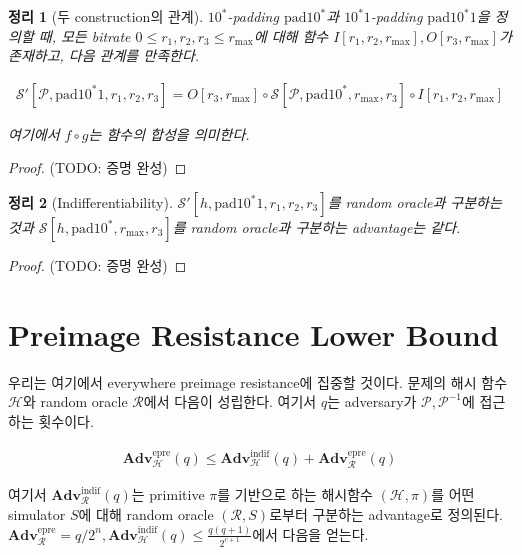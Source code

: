 \documentclass{article}
\newtheorem{theorem}{정리}
\newcommand{\adv}{\mathbf{Adv}}
\begin{document}
  \begin{theorem}[두 construction의 관계]
    \(10^*\)-padding \(\mathrm{pad10^*}\)과 \(10^*1\)-padding \(\mathrm{pad10^*1}\)을 정의할 때, 모든 bitrate \(0 \leq r_1, r_2, r_3 \leq r_\mathrm{max}\)에 대해 함수 \(I[r_1, r_2, r_\mathrm{max}], O[r_3, r_\mathrm{max}]\)가 존재하고, 다음 관계를 만족한다.

    \begin{align*}
      \mathcal{S}'[\mathcal{P}, \mathrm{pad10^*1}, r_1, r_2, r_3] = O[r_3, r_\mathrm{max}] \circ \mathcal{S}[\mathcal{P}, \mathrm{pad10^*}, r_\mathrm{max}, r_3] \circ I[r_1, r_2, r_\mathrm{max}]
    \end{align*}

    여기에서 \(f \circ g\)는 함수의 합성을 의미한다.
  \end{theorem}
  \begin{proof}
    (TODO: 증명 완성)
  \end{proof}

  \begin{theorem}[Indifferentiability]
    \(\mathcal{S}'[h, \mathrm{pad10^*1}, r_1, r_2, r_3]\)를 random oracle과 구분하는 것과 \(\mathcal{S}[h, \mathrm{pad10^*}, r_\mathrm{max}, r_3]\)를 random oracle과 구분하는 advantage는 같다.
  \end{theorem}
  \begin{proof}
    (TODO: 증명 완성)
  \end{proof}

  \section{Preimage Resistance Lower Bound}
  우리는 여기에서 everywhere preimage resistance에 집중할 것이다.\cite{rogaway_cryptographic_2004} 문제의 해시 함수 \(\mathcal{H}\)와 random oracle \(\mathcal{R}\)에서 다음이 성립한다.\cite{andreeva_security_2011} 여기서 \(q\)는 adversary가 \(\mathcal{P}, \mathcal{P}^{-1}\)에 접근하는 횟수이다.

  \begin{align}\label{epre_adv_bound}
    \adv^\text{epre}_\mathcal{H}(q) \leq \adv^\text{indif}_\mathcal{H}(q) + \adv^\text{epre}_\mathcal{R}(q)
  \end{align}

  여기서 \(\adv^\text{indif}_\mathcal{R}(q)\)는 primitive \(\pi\)를 기반으로 하는 해시함수 \((\mathcal{H}, \pi)\)를 어떤 simulator \(S\)에 대해 random oracle \((\mathcal{R}, S)\)로부터 구분하는 advantage로 정의된다. \(\adv^\text{epre}_\mathcal{R}=q/2^n, \adv^\text{indif}_\mathcal{H}(q)\leq \frac{q(q + 1)}{2^{c + 1}}\)에서 다음을 얻는다.
\end{document}
